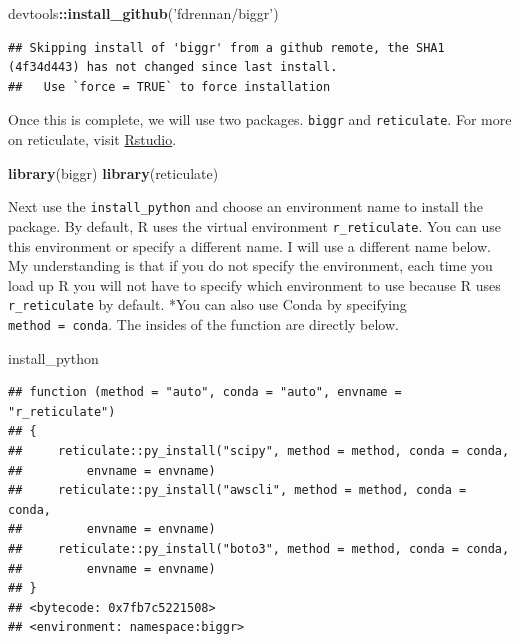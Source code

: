 \documentclass[]{book}
\newenvironment{Shaded}{\begin{snugshade}}{\end{snugshade}}
\newcommand{\KeywordTok}[1]{\textcolor[rgb]{0.13,0.29,0.53}{\textbf{#1}}}
\newcommand{\NormalTok}[1]{#1}
\newcommand{\OperatorTok}[1]{\textcolor[rgb]{0.81,0.36,0.00}{\textbf{#1}}}
\newcommand{\StringTok}[1]{\textcolor[rgb]{0.31,0.60,0.02}{#1}}
\begin{document}
\begin{Shaded}
\begin{Highlighting}[]
\NormalTok{devtools}\OperatorTok{::}\KeywordTok{install_github}\NormalTok{(}\StringTok{'fdrennan/biggr'}\NormalTok{)}
\end{Highlighting}
\end{Shaded}

\begin{verbatim}
## Skipping install of 'biggr' from a github remote, the SHA1 (4f34d443) has not changed since last install.
##   Use `force = TRUE` to force installation
\end{verbatim}

Once this is complete, we will use two packages. \texttt{biggr} and \texttt{reticulate}. For more on reticulate, visit \href{https://rstudio.github.io/reticulate/}{Rstudio}.

\begin{Shaded}
\begin{Highlighting}[]
\KeywordTok{library}\NormalTok{(biggr)}
\KeywordTok{library}\NormalTok{(reticulate)}
\end{Highlighting}
\end{Shaded}

Next use the \texttt{install\_python} and choose an environment name to install the package. By default, R uses the virtual environment \texttt{r\_reticulate}. You can use this environment or specify a different name. I will use a different name below. My understanding is that if you do not specify the environment, each time you load up R you will not have to specify which environment to use because R uses \texttt{r\_reticulate} by default. *You can also use Conda by specifying \texttt{method\ =\ conda}. The insides of the function are directly below.

\begin{Shaded}
\begin{Highlighting}[]
\NormalTok{install_python}
\end{Highlighting}
\end{Shaded}

\begin{verbatim}
## function (method = "auto", conda = "auto", envname = "r_reticulate") 
## {
##     reticulate::py_install("scipy", method = method, conda = conda, 
##         envname = envname)
##     reticulate::py_install("awscli", method = method, conda = conda, 
##         envname = envname)
##     reticulate::py_install("boto3", method = method, conda = conda, 
##         envname = envname)
## }
## <bytecode: 0x7fb7c5221508>
## <environment: namespace:biggr>
\end{verbatim}
\end{document}
